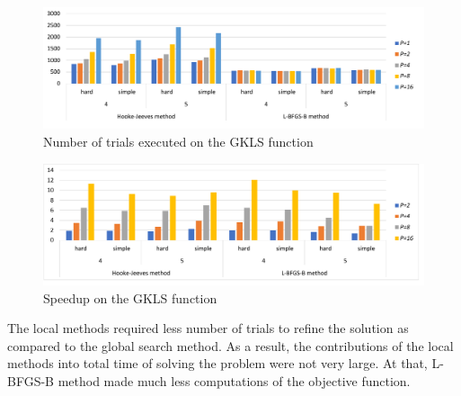 \documentclass[runningheads]{llncs}
\begin{document}


\begin{figure}
\begin{center}
  \includegraphics[width=1.0\linewidth]{GKLSNT.pdf}
  \caption{Number of trials executed on the GKLS function}
  \label{fig:GKLSNT}  
\end{center}
\end{figure}

\begin{figure}
\begin{center}
  \includegraphics[width=1.0\linewidth]{GKLSSpeedup.pdf}
  \caption{Speedup on the GKLS function}
  \label{fig:GKLSSpeedup}  
\end{center}
\end{figure}


The local methods required less number of trials to refine the solution as compared to the global search method. As a result, the contributions of the local methods into total time of solving the problem were not very large. At that, L-BFGS-B method made much less computations of the objective function.
\end{document}
